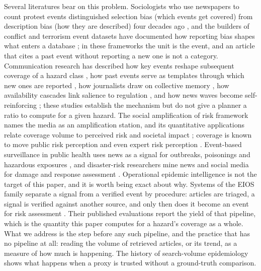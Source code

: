 \documentclass[1p,times]{elsarticle}
\begin{document}
Several literatures bear on this problem. Sociologists who use newspapers to count protest events distinguished selection bias (which events get covered) from description bias (how they are described) four decades ago \cite{earl2004,strawn2008,ortiz2005,zhang2023}, and the builders of conflict and terrorism event datasets have documented how reporting bias shapes what enters a database \cite{weidmann2016,baum2015,raleigh2010,lafree2007,wang2016}; in these frameworks the unit is the event, and an article that cites a past event without reporting a new one is not a category. Communication research has described how key events reshape subsequent coverage of a hazard class \cite{kepplinger1995,brosius1995}, how past events serve as templates through which new ones are reported \cite{kitzinger2000}, how journalists draw on collective memory \cite{edy1999}, how availability cascades link salience to regulation \cite{kuran1999}, and how news waves become self-reinforcing \cite{vasterman2005,wien2009}; these studies establish the mechanism but do not give a planner a ratio to compute for a given hazard. The social amplification of risk framework \cite{kasperson1988,pidgeon2003,kasperson2022} names the media as an amplification station, and its quantitative applications relate coverage volume to perceived risk and societal impact \cite{renn1992,burns1993}; coverage is known to move public risk perception \cite{wahlberg2000,nellis2012} and even expert risk perception \cite{won2025}. Event-based surveillance in public health uses news as a signal for outbreaks, poisonings and hazardous exposures \cite{freifeld2008,brownstein2009,hartley2010,barboza2014,abbood2020,mcknight2024,cook2021,rodde2025}, and disaster-risk researchers mine news and social media for damage and response assessment \cite{olteanu2015,imran2015,murthy2025,vescovo2026,erokhin2024}. Operational epidemic intelligence is not the target of this paper, and it is worth being exact about why. Systems of the EIOS family separate a signal from a verified event by procedure: articles are triaged, a signal is verified against another source, and only then does it become an event for risk assessment \cite{williams2025eios,rodde2025}. Their published evaluations report the yield of that pipeline, which is the quantity this paper computes for a hazard's coverage as a whole. What we address is the step before any such pipeline, and the practice that has no pipeline at all: reading the volume of retrieved articles, or its trend, as a measure of how much is happening. The history of search-volume epidemiology \cite{ginsberg2009,lazer2014} shows what happens when a proxy is trusted without a ground-truth comparison.
\end{document}
